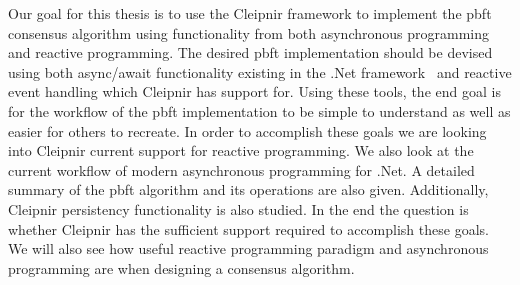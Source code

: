 Our goal for this thesis is to use the Cleipnir framework to implement the \ac{pbft} consensus algorithm using functionality from both asynchronous programming and reactive programming. The desired \ac{pbft} implementation should be devised using both async/await functionality existing in the .Net framework~\cite{DOC:AsyncAwait} and reactive event handling which Cleipnir has support for. Using these tools, the end goal is for the workflow of the \ac{pbft} implementation to be simple to understand as well as easier for others to recreate. In order to accomplish these goals we are looking into Cleipnir current support for reactive programming. We also look at the current workflow of modern asynchronous programming for .Net. A detailed summary of the \ac{pbft} algorithm and its operations are also given. Additionally, Cleipnir persistency functionality is also studied.
In the end the question is whether Cleipnir has the sufficient support required to accomplish these goals. We will also see how useful reactive programming paradigm and asynchronous programming are when designing a consensus algorithm.



